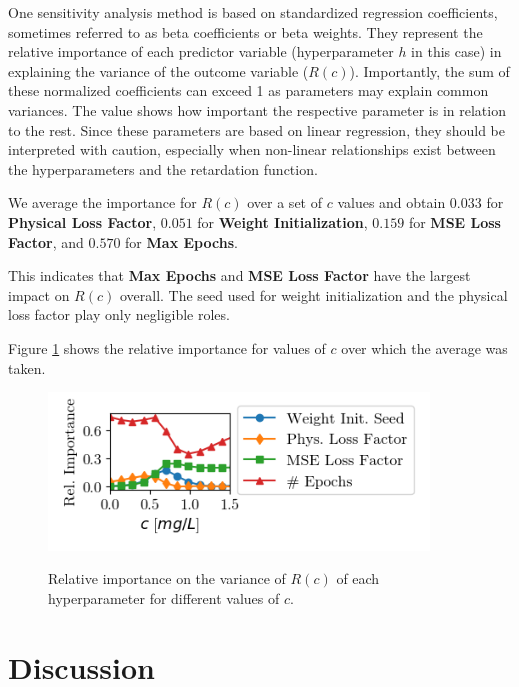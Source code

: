 \documentclass{article}
\begin{document}
One sensitivity analysis method is based on standardized regression coefficients, sometimes referred to as beta coefficients or beta weights. They represent the relative importance of each predictor variable (hyperparameter $h$ in this case) in explaining the variance of the outcome variable ($R(c)$).
Importantly, the sum of these normalized coefficients can exceed 1 as parameters may explain common variances. The value shows how important the respective parameter is in relation to the rest.
Since these parameters are based on linear regression, they should be interpreted with caution, especially when non-linear relationships exist between the hyperparameters and the retardation function.

We average the importance for $R(c)$ over a set of $c$ values and obtain $0.033$ for \textbf{Physical Loss Factor}, $0.051$ for \textbf{Weight Initialization}, $0.159$ for \textbf{MSE Loss Factor}, and $0.570$ for \textbf{Max Epochs}.

This indicates that \textbf{Max Epochs} and \textbf{MSE Loss Factor} have the largest impact on $R(c)$ overall. The seed used for weight initialization and the physical loss factor play only negligible roles.

Figure \ref{fig:sensitivity} shows the relative importance for values of $c$ over which the average was taken.


\begin{figure}
    \centering
    \includegraphics[width=0.9\textwidth]{figs/sensitivity.png}
    \label{fig:sensitivity}
    \caption{Relative importance on the variance of $R(c)$ of each hyperparameter for different values of $c$.}
\end{figure}



\section{Discussion}
\end{document}
